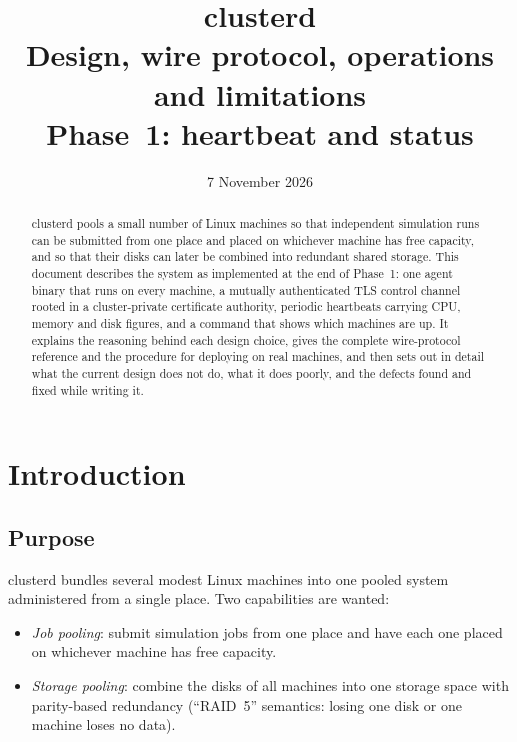 \documentclass{article}
\title{clusterd\\[1ex]
  \large Design, wire protocol, operations and limitations\\
  Phase~1: heartbeat and status}
\author{}
\date{7 November 2026}
\begin{document}
\maketitle

\begin{abstract}
clusterd pools a small number of Linux machines so that independent
simulation runs can be submitted from one place and placed on whichever
machine has free capacity, and so that their disks can later be combined
into redundant shared storage. This document describes the system as
implemented at the end of Phase~1: one agent binary that runs on every
machine, a mutually authenticated TLS control channel rooted in a
cluster-private certificate authority, periodic heartbeats carrying CPU,
memory and disk figures, and a  command that shows
which machines are up. It explains the reasoning behind each design
choice, gives the complete wire-protocol reference and the procedure for
deploying on real machines, and then sets out in detail what the current
design does not do, what it does poorly, and the defects found and fixed
while writing it.
\end{abstract}

\tableofcontents

\section{Introduction}

\subsection{Purpose}

clusterd bundles several modest Linux machines into one pooled system
administered from a single place. Two capabilities are wanted:

\begin{itemize}
  \item \emph{Job pooling}: submit simulation jobs from one place and have
    each one placed on whichever machine has free capacity.
  \item \emph{Storage pooling}: combine the disks of all machines into one
    storage space with parity-based redundancy (``RAID~5'' semantics:
    losing one disk or one machine loses no data).
\end{itemize}
\end{document}
